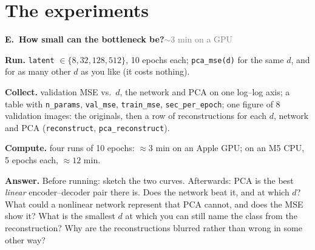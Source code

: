 \documentclass[11pt]{article}
\newcommand{\code}[1]{\texttt{#1}}
\newcounter{exp}
\newenvironment{experiment}[2]{\refstepcounter{exp}\par\medskip
  \textbf{\textcolor{aiblue}{E\theexp.\ #1}}\hfill{\small\textcolor{gray}{#2}}\par}{\par}
\newcommand{\run}[1]{\textbf{Run.} #1\par}
\newcommand{\collect}[1]{\textbf{Collect.} #1\par}
\newcommand{\answer}[1]{\textbf{Answer.} #1\par}
\newcommand{\heavy}[1]{\textcolor{gray!70!black}{\textbf{Compute.} #1}\par}
\begin{document}
\section*{The experiments}
\setcounter{exp}{21}

\begin{experiment}{How small can the bottleneck be?}{$\sim$3 min on a GPU}
\run{\code{latent} $\in\{8, 32, 128, 512\}$, 10 epochs each; \code{pca\_mse(d)} for the same $d$, and for as many other $d$ as you like (it costs nothing).}
\collect{validation MSE vs.\ $d$, the network and PCA on one log--log axis; a table with \code{n\_params}, \code{val\_mse}, \code{train\_mse}, \code{sec\_per\_epoch}; one figure of 8 validation images: the originals, then a row of reconstructions for each $d$, network and PCA (\code{reconstruct}, \code{pca\_reconstruct}).}
\heavy{four runs of 10 epochs: $\approx3$ min on an Apple GPU; on an M5 CPU, 5 epochs each, $\approx12$ min.}
\answer{Before running: sketch the two curves. Afterwards: PCA is the best \emph{linear} encoder--decoder pair there is. Does the network beat it, and at which $d$? What could a nonlinear network represent that PCA cannot, and does the MSE show it? What is the smallest $d$ at which you can still name the class from the reconstruction? Why are the reconstructions blurred rather than wrong in some other way?}
\end{experiment}
\end{document}
